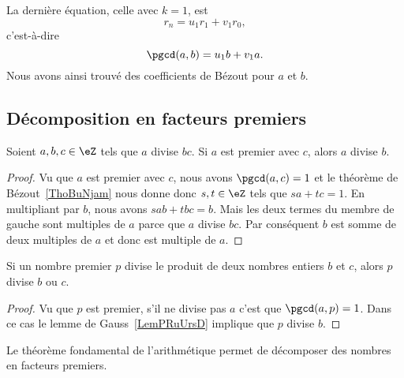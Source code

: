 La dernière équation, celle avec \( k=1\), est
\begin{equation}
    r_n=u_1r_1+v_1r_0,
\end{equation}
c'est-à-dire
\begin{equation}        \label{EqNDMLooDvaiAc}
    \pgcd(a,b)=u_1b+v_1a.
\end{equation}
Nous avons ainsi trouvé des coefficients de Bézout pour $a$ et $b$.

\subsection{Décomposition en facteurs premiers}

\begin{lemma}    \label{LemPRuUrsD}
    Soient \( a,b,c\in \eZ\) tels que \( a\) divise \( bc\). Si \( a\) est premier avec \( c\), alors \( a\) divise \( b\).
\end{lemma}

\begin{proof}
    Vu que \( a\) est premier avec \( c\), nous avons \( \pgcd(a,c)=1\) et le théorème de Bézout~\ref{ThoBuNjam} nous donne donc \( s,t\in \eZ\) tels que \( sa+tc=1\). En multipliant par \( b\), nous avons $sab+tbc=b$. Mais les deux termes du membre de gauche sont multiples de \( a\) parce que \( a\) divise \( bc\). Par conséquent \( b\) est somme de deux multiples de \( a\) et donc est multiple de \( a\).
\end{proof}

\begin{lemma}       \label{LemAXINooOeuMJZ}
    Si un nombre premier $p$ divise le produit de deux nombres entiers $b$ et $c$, alors $p$ divise $b$ ou $c$.
\end{lemma}

\begin{proof}
    Vu que \( p\) est premier, s'il ne divise pas \( a\) c'est que \( \pgcd(a,p)=1\). Dans ce cas le lemme de Gauss~\ref{LemPRuUrsD} implique que \( p\) divise \( b\).
\end{proof}

Le théorème fondamental de l'arithmétique permet de décomposer des nombres en facteurs premiers.

